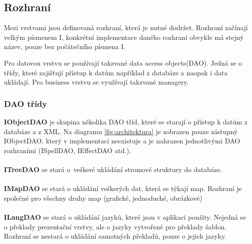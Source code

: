 \documentclass[thesis=B,czech]{resources/FITthesis}[2012/06/26]
\begin{document}
\subsection{Rozhraní}
Mezi vrstvami jsou definovaná rozhraní, která je nutné dodržet. Rozhraní začínají velkým písmenem I, konkrétní implementace daného rozhraní obvykle má stejný název, pouze bez počátečního písmena I.\par

Pro datovou vrstvu se používají takzvané \clqq data access objects\crqq (DAO). Jedná se o třídy, které zajišťují přístup k datům například z databáze a naopak i data ukládají. Pro business vrstvu se využívají takzvané \clqq managery\crqq .
\subsubsection*{DAO třídy}
\noindent\textbf{IObjectDAO} je skupina několika DAO tříd, které se starají o přístup k datům z databáze a z XML. Na diagramu \ref{fig:architektura} je zobrazen pouze zástupný IObjectDAO, který v implementaci neexistuje a je nahrazen jednotlivými DAO rozhraními (ISpellDAO, IEffectDAO atd.).\\
\\
\textbf{ITreeDAO} se stará o~veškeré ukládání stromové struktury do databáze. \\
\\
\textbf{IMapDAO} se stará o ukládání veškerých dat, která se týkají map. Rozhraní je společné pro všechny druhy map (grafické, jednoduché, obrázkové)\\
\\
\textbf{ILangDAO} se stará o ukládání jazyků, které jsou v aplikaci použity. Nejedná se o překlady prezentační vrstvy, ale o jazyky vytvořené pro překlady šablon. Rozhraní se nestará o ukládání samotných překladů, pouze o jejich jazyky.
\end{document}
